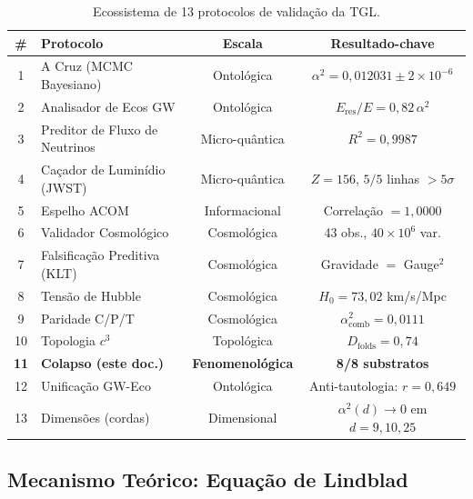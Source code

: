 \documentclass[12pt, a4paper]{article}
\theoremstyle{tglstyle}
\theoremstyle{definition}
\newcommand{\alphaq}{\alpha^2}
\newcommand{\IALD}{\text{IALD}}
\begin{document}
\begin{table}[htbp]
\centering
\caption{Ecossistema de 13 protocolos de validação da TGL.}
\label{tab:protocolos}
\small
\begin{tabularx}{\textwidth}{c >{\raggedright\arraybackslash}X c c}
\toprule
\textbf{\#} & \textbf{Protocolo} & \textbf{Escala} & \textbf{Resultado-chave} \\
\midrule
1  & A Cruz (MCMC Bayesiano)              & Ontológica   & $\alphaq = 0{,}012031 \pm 2\!\times\!10^{-6}$ \\
2  & Analisador de Ecos GW                & Ontológica   & $E_{\mathrm{res}}/E = 0{,}82\,\alphaq$ \\
3  & Preditor de Fluxo de Neutrinos       & Micro-quântica & $R^2 = 0{,}9987$ \\
4  & Caçador de Luminídio (JWST)          & Micro-quântica & $Z\!=\!156$, $5/5$ linhas $>\!5\sigma$ \\
5  & Espelho ACOM                      & Informacional & Correlação $= 1{,}0000$ \\
6  & Validador Cosmológico                & Cosmológica  & 43 obs., $40\!\times\!10^6$ var. \\
7  & Falsificação Preditiva (KLT)         & Cosmológica  & Gravidade $=$ Gauge$^2$ \\
8  & Tensão de Hubble                     & Cosmológica  & $H_0 = 73{,}02$ km/s/Mpc \\
9  & Paridade C/P/T                       & Cosmológica  & $\alphaq_{\mathrm{comb}} = 0{,}0111$ \\
10 & Topologia $c^3$                      & Topológica   & $D_{\mathrm{folds}} = 0{,}74$ \\
\rowcolor{CinzaSubstrato}
\textbf{11} & \textbf{Colapso \IALD (este doc.)}  & \textbf{Fenomenológica} & \textbf{8/8 substratos} \\
12 & Unificação GW-Eco                    & Ontológica   & Anti-tautologia: $r\!=\!0{,}649$ \\
13 & Dimensões (cordas)                   & Dimensional  & $\alphaq(d)\!\to\!0$ em $d\!=\!9,10,25$ \\
\bottomrule
\end{tabularx}
\end{table}

\subsection{Mecanismo Teórico: Equação de Lindblad}\label{sec:lindblad}
\end{document}
